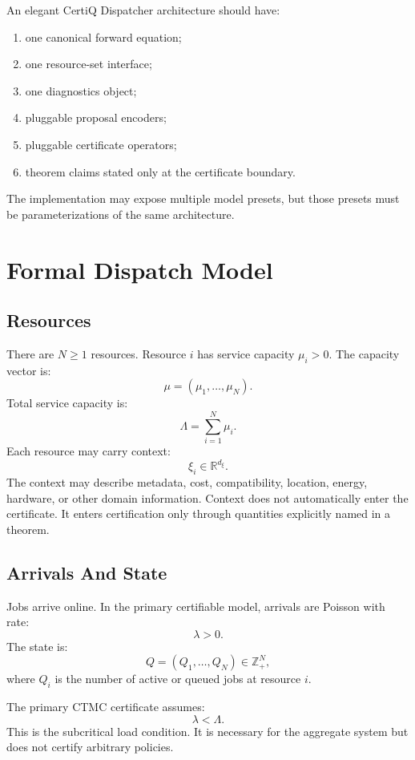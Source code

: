 \documentclass[a4paper,11pt]{article}
\theoremstyle{definition}
\begin{document}
An elegant CertiQ Dispatcher architecture should have:
\begin{enumerate}
  \item one canonical forward equation;
  \item one resource-set interface;
  \item one diagnostics object;
  \item pluggable proposal encoders;
  \item pluggable certificate operators;
  \item theorem claims stated only at the certificate boundary.
\end{enumerate}
The implementation may expose multiple model presets, but those presets must
be parameterizations of the same architecture.

\section{Formal Dispatch Model}

\subsection{Resources}

There are \(N\ge 1\) resources. Resource \(i\) has service capacity
\(\mu_i>0\). The capacity vector is:
\[
\mu=(\mu_1,\ldots,\mu_N).
\]
Total service capacity is:
\[
\Lambda=\sum_{i=1}^N\mu_i.
\]
Each resource may carry context:
\[
\xi_i\in\mathbb R^{d_\xi}.
\]
The context may describe metadata, cost, compatibility, location, energy,
hardware, or other domain information. Context does not automatically enter the
certificate. It enters certification only through quantities explicitly named
in a theorem.

\subsection{Arrivals And State}

Jobs arrive online. In the primary certifiable model, arrivals are Poisson with
rate:
\[
\lambda>0.
\]
The state is:
\[
Q=(Q_1,\ldots,Q_N)\in\mathbb Z_+^N,
\]
where \(Q_i\) is the number of active or queued jobs at resource \(i\).

The primary CTMC certificate assumes:
\[
\lambda<\Lambda.
\]
This is the subcritical load condition. It is necessary for the aggregate
system but does not certify arbitrary policies.
\end{document}
